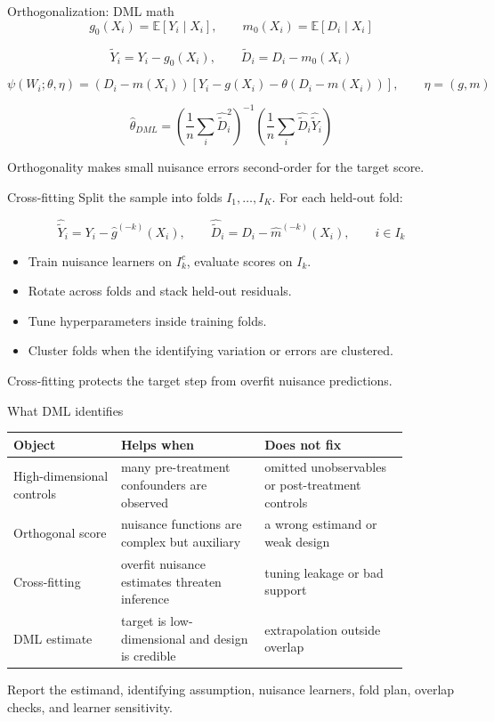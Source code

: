 \documentclass[aspectratio=169,11pt]{beamer}
\newcommand{\E}{\mathbb{E}}
\newcommand{\1}{\mathbf{1}}
\begin{document}
\begin{frame}{Orthogonalization: DML math}
\small
\[
g_0(X_i)=\E[Y_i\mid X_i],
\qquad
m_0(X_i)=\E[D_i\mid X_i]
\]

\[
\widetilde Y_i=Y_i-g_0(X_i),
\qquad
\widetilde D_i=D_i-m_0(X_i)
\]

\[
\psi(W_i;\theta,\eta)=
\left(D_i-m(X_i)\right)
\left[Y_i-g(X_i)-\theta\left(D_i-m(X_i)\right)\right],
\qquad
\eta=(g,m)
\]

\[
\widehat\theta_{DML}
=
\left(\frac{1}{n}\sum_i\widehat{\widetilde D}_i^2\right)^{-1}
\left(\frac{1}{n}\sum_i\widehat{\widetilde D}_i\widehat{\widetilde Y}_i\right)
\]

Orthogonality makes small nuisance errors second-order for the target score.
\end{frame}

\begin{frame}{Cross-fitting}
\small
Split the sample into folds \(I_1,\ldots,I_K\). For each held-out fold:

\[
\widehat{\widetilde Y}_i
=
Y_i-\widehat g^{(-k)}(X_i),
\qquad
\widehat{\widetilde D}_i
=
D_i-\widehat m^{(-k)}(X_i),
\qquad
i\in I_k
\]

\medskip
\begin{itemize}
    \item Train nuisance learners on \(I_k^c\), evaluate scores on \(I_k\).
    \item Rotate across folds and stack held-out residuals.
    \item Tune hyperparameters inside training folds.
    \item Cluster folds when the identifying variation or errors are clustered.
\end{itemize}

\medskip
Cross-fitting protects the target step from overfit nuisance predictions.
\end{frame}

\begin{frame}{What DML identifies}
\small
\begin{tabular}{p{0.24\linewidth} p{0.32\linewidth} p{0.32\linewidth}}
\toprule
Object & Helps when & Does not fix \\
\midrule
High-dimensional controls & many pre-treatment confounders are observed & omitted unobservables or post-treatment controls \\
Orthogonal score & nuisance functions are complex but auxiliary & a wrong estimand or weak design \\
Cross-fitting & overfit nuisance estimates threaten inference & tuning leakage or bad support \\
DML estimate & target is low-dimensional and design is credible & extrapolation outside overlap \\
\bottomrule
\end{tabular}

\medskip
Report the estimand, identifying assumption, nuisance learners, fold plan, overlap checks, and learner sensitivity.
\end{frame}
\end{document}
